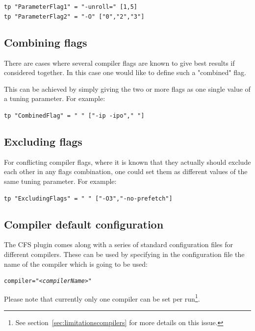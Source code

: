 \documentclass[11pt,a4paper, oneside]{book} %
\newenvironment{code}%
{
\addtolength{\leftskip}{0.5cm}}%
{

}
\begin{document}
\begin{code}
\texttt{tp "ParameterFlag1" = "-unroll=" [1,5]}\\
\texttt{tp "ParameterFlag2" = "-O" ["0","2","3"]}
\end{code}

\subsection{Combining flags}
There are cases where several compiler flags are known to give best results if considered together. In this case one would like to define such a "combined" flag.

This can be achieved by simply giving the two or more flags as one single value of a tuning parameter. For example:

\begin{code}
\begin{minipage}{0.8\textwidth}
\texttt{\texttt{tp "CombinedFlag" = " " ["-ip -ipo"," "]}}
\end{minipage}
\end{code}

\subsection{Excluding flags}
For conflicting compiler flags, where it is known that they actually should exclude each other in any flags combination, one could set them as different values of the same tuning parameter. For example:

\begin{code}
\texttt{tp "ExcludingFlags" = " " ["-O3","-no-prefetch"]}
\end{code}

\subsection{Compiler default configuration}\label{sec:compilerconfig}
The CFS plugin comes along with a series of standard configuration files for different compilers. These can be used by specifying in the configuration file the name of the compiler which is going to be used:
\begin{center}
\begin{minipage}{0.8\textwidth}
\texttt{compiler="\textit{<compilerName>"}}
\end{minipage}
\end{center}


Please note that currently only one compiler can be set per run\footnote{See section~\ref{sec:limitationscompilers} for more details on this issue.}.
\end{document}
